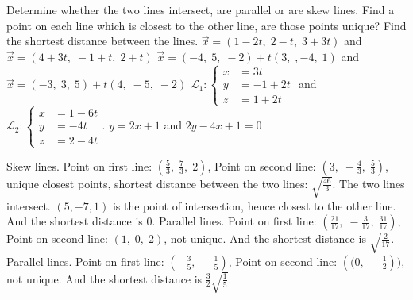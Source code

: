 
\begin{Exercise}[
name={},
title={}, 
difficulty=0,
origin={\cite{YL}}]
Determine whether the two lines intersect, are parallel or are skew lines.  Find a point on each line which is closest to the other line, are those points unique?  Find the shortest distance between the lines.
\Question $\vec{x}=(1-2t,\;2-t,\;3+3t)$ and $\vec{x}=(4+3t,\; -1+t,\; 2+t)$
\Question $\vec{x}=(-4,\;5,\;-2)+t(3,\;,-4,\; 1)$ and $\vec{x}=(-3,\; 3,\; 5)+t(4,\;-5,\;-2)$
\Question $\mathcal{L}_1: \left\{\begin{aligned} x&=3t\\y&=-1+2t\\z&=1+2t\end{aligned}\right.$ and 
$\mathcal{L}_2: \left\{\begin{aligned} x&=1-6t\\y&=-4t\\z&=2-4t\end{aligned}\right.$.
\Question $y=2x+1$ and $2y-4x+1=0$

\end{Exercise}
\begin{Answer}
\Question Skew lines. 
Point on first line: $\left(\frac{5}{3},\; \frac{7}{3},\; 2\right)$, Point on second line: $\left(3,\; -\frac{4}{3},\; \frac{5}{3}\right)$, unique closest points, shortest distance between the two lines: $\sqrt{\frac{46}{3}}$.
\Question The two lines intersect. $(5, -7, 1)$ is the point of intersection, hence closest to the other line.  And the shortest distance is $0$.
\Question Parallel lines. Point on first line: $\left(\frac{21}{17},\; -\frac{3}{17},\; \frac{31}{17}\right)$, Point on second line: $\left(1,\; 0,\; 2\right)$, not unique. And the shortest distance is $\sqrt{\frac{2}{17}}$.
\Question Parallel lines. 
Point on first line: $\left(-\frac{3}{5},\; -\frac{1}{5}\right)$, Point on second line: $\left((0,\; -\frac{1}{2}\right))$, not unique. And the shortest distance is $\frac{3}{2}\sqrt{\frac{1}{5}}$.
\end{Answer}

